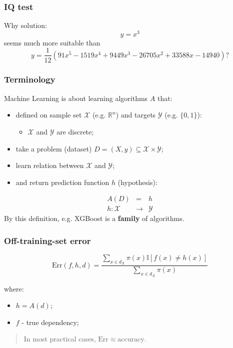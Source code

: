 \documentclass[mathserif, aspectratio=43]{beamer}
\begin{document}
\begin{frame}[fragile]
\frametitle{IQ test}
Why solution:
$$y = x^3$$seems much more suitable than
$$y = \frac{1}{12}(91 x^5 - 1519 x^4 + 9449 x^3 - 26705 x^2 + 33588 x - 14940)?$$


\end{frame}


\begin{frame}[fragile]
\frametitle{Terminology}
Machine Learning is about learning algorithms $A$ that:
\begin{itemize}
\item defined on sample set $\mathcal{X}$ (e.g. $\mathbb{R}^n$) and targets $\mathcal{Y}$ (e.g. $\{0, 1\}$):\begin{itemize}
\item $\mathcal{X}$ and $\mathcal{Y}$ are discrete;
\end{itemize}

\item take a problem (dataset) $D = (X, y) \subseteq \mathcal{X} \times \mathcal{Y}$;
\item learn relation between $\mathcal{X}$ and $\mathcal{Y}$;
\item and return prediction function $h$ (hypothesis):
\end{itemize}
\begin{eqnarray*}
  A(D) &=& h\\
  h: \mathcal{X} &\to& \mathcal{Y}
\end{eqnarray*}
By this definition, e.g. XGBoost is a \textbf{family} of algorithms.

\end{frame}


\begin{frame}[fragile]
\frametitle{Off-training-set error}
$$\mathrm{Err}(f, h, d) = \frac{\sum_{x \in d_X} \pi(x) \mathbb{I}[ f(x) \neq h(x) ]}{\sum_{x \in d_X} \pi(x)}$$

where:
\begin{itemize}
\item $h = A(d)$;
\item $f$ - true dependency;
\end{itemize}
\vfill
\begin{quote}
In most practical cases, $\mathrm{Err} \approx \mathrm{accuracy}$.

\end{quote}

\end{frame}
\end{document}
